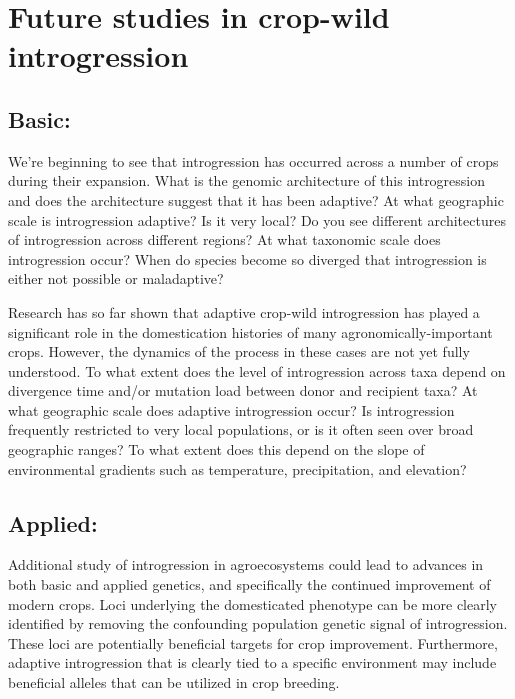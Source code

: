 \documentclass[11pt]{article}
\newcommand{\gmj}[1]{\textcolor{blue}{ \emph{\scriptsize  #1}} } %
\begin{document}


\section*{Future studies in crop-wild introgression}


\subsection*{Basic:}
We're beginning to see that introgression has occurred across a number of crops during their expansion.
What is the genomic architecture of this introgression and does the architecture suggest that it has been adaptive?
At what geographic scale is introgression adaptive?  Is it very local?  Do you see different architectures of introgression across different regions?
At what taxonomic scale does introgression occur?  When do species become so diverged that introgression is either not possible or maladaptive?

Research has so far shown that adaptive crop-wild introgression has played a significant role in the domestication histories of many agronomically-important crops.
However, the dynamics of the process in these cases are not yet fully understood.
To what extent does the level of introgression across taxa depend on divergence time and/or mutation load between donor and recipient taxa?
At what geographic scale does adaptive introgression occur?
Is introgression frequently restricted to very local populations, or is it often seen over broad geographic ranges?
To what extent does this depend on the slope of environmental gradients such as temperature, precipitation, and elevation?


\subsection*{Applied:}
Additional study of introgression in agroecosystems could lead to advances in both basic and applied genetics, and specifically the continued improvement of modern crops.
Loci underlying the domesticated phenotype can be more clearly identified by removing the confounding population genetic signal of introgression.
These loci are potentially beneficial targets for crop improvement.
Furthermore, adaptive introgression that is clearly tied to a specific environment may include beneficial alleles that can be utilized in crop breeding.
\end{document}
